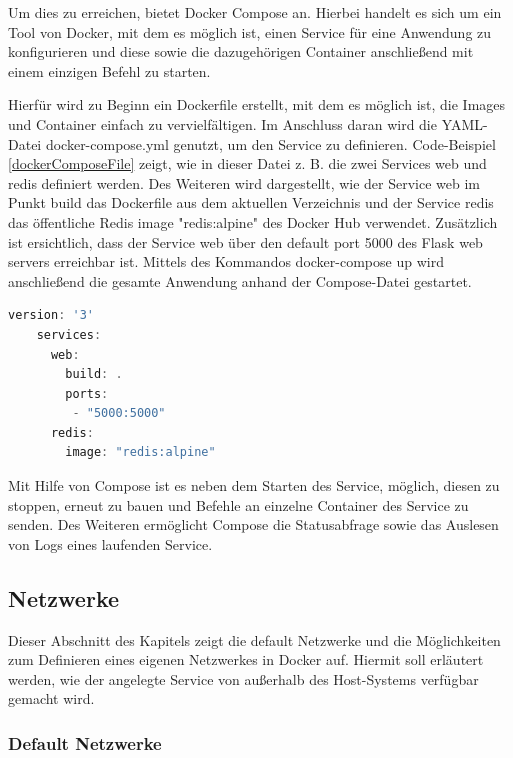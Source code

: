 Um dies zu erreichen, bietet Docker Compose an.
Hierbei handelt es sich um ein Tool von Docker, mit dem es möglich ist, einen Service für eine Anwendung zu konfigurieren und diese sowie die dazugehörigen Container anschließend mit einem einzigen Befehl zu starten.

Hierfür wird zu Beginn ein Dockerfile erstellt, mit dem es möglich ist, die Images und Container einfach zu vervielfältigen.
Im Anschluss daran wird die YAML-Datei docker-compose.yml genutzt, um den Service zu definieren.
Code-Beispiel \ref{dockerComposeFile} zeigt, wie in dieser Datei z. B. die zwei Services web und redis definiert werden.
Des Weiteren wird dargestellt, wie der Service web im Punkt build das Dockerfile aus dem aktuellen Verzeichnis und der Service redis das öffentliche Redis image "redis:alpine" des Docker Hub verwendet.
Zusätzlich ist ersichtlich, dass der Service web über den default port 5000 des Flask web servers erreichbar ist.
Mittels des Kommandos docker-compose up wird anschließend die gesamte Anwendung anhand der Compose-Datei gestartet.

\begin{minipage}{\linewidth}
	\begin{lstlisting}[frame=single,caption=Beispiel Docker Compose Datei, label=dockerComposeFile, language=Scala]
	version: '3'
	services:
	  web:
	    build: .
	    ports:
	     - "5000:5000"
	  redis:
	    image: "redis:alpine"
	\end{lstlisting}
\end{minipage}

Mit Hilfe von Compose ist es neben dem Starten des Service, möglich, diesen zu stoppen, erneut zu bauen und Befehle an einzelne Container des Service zu senden.
Des Weiteren ermöglicht Compose die Statusabfrage sowie das Auslesen von Logs eines laufenden Service.

\subsection{Netzwerke}

Dieser Abschnitt des Kapitels zeigt die default Netzwerke und die Möglichkeiten zum Definieren eines eigenen Netzwerkes in Docker auf.
Hiermit soll erläutert werden, wie der angelegte Service von außerhalb des Host-Systems verfügbar gemacht wird.

\subsubsection{Default Netzwerke}


